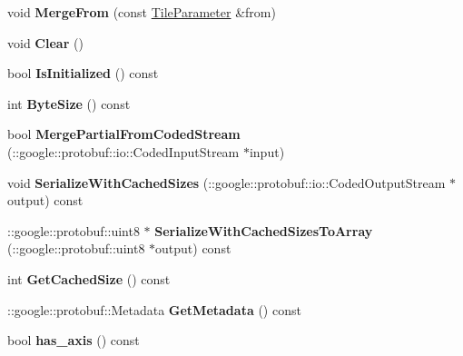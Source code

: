 \begin{DoxyCompactItemize}
void {\bfseries Merge\+From} (const \mbox{\hyperlink{classcaffe_1_1_tile_parameter}{Tile\+Parameter}} \&from)
\item 
\mbox{\label{classcaffe_1_1_tile_parameter_a7fba77cde4fec14435a2952eab535b62}} 
void {\bfseries Clear} ()
\item 
\mbox{\label{classcaffe_1_1_tile_parameter_a5b1913c75e58b26e7419bb8704f5d64e}} 
bool {\bfseries Is\+Initialized} () const
\item 
\mbox{\label{classcaffe_1_1_tile_parameter_ab3da1188e9cdfc7d8caee71db590a9c8}} 
int {\bfseries Byte\+Size} () const
\item 
\mbox{\label{classcaffe_1_1_tile_parameter_a9c9c8315e1be7193912828ce9f94c58e}} 
bool {\bfseries Merge\+Partial\+From\+Coded\+Stream} (\+::google\+::protobuf\+::io\+::\+Coded\+Input\+Stream $\ast$input)
\item 
\mbox{\label{classcaffe_1_1_tile_parameter_a80834c6845bc094534df01d173f0834c}} 
void {\bfseries Serialize\+With\+Cached\+Sizes} (\+::google\+::protobuf\+::io\+::\+Coded\+Output\+Stream $\ast$output) const
\item 
\mbox{\label{classcaffe_1_1_tile_parameter_ad829bd891e4b68d05787a52db4cda269}} 
\+::google\+::protobuf\+::uint8 $\ast$ {\bfseries Serialize\+With\+Cached\+Sizes\+To\+Array} (\+::google\+::protobuf\+::uint8 $\ast$output) const
\item 
\mbox{\label{classcaffe_1_1_tile_parameter_a6036e6ff22db5759f32b4b5d6366e2a4}} 
int {\bfseries Get\+Cached\+Size} () const
\item 
\mbox{\label{classcaffe_1_1_tile_parameter_a7fdf1765075b00e72b67e8354ecef5f1}} 
\+::google\+::protobuf\+::\+Metadata {\bfseries Get\+Metadata} () const
\item 
\mbox{\label{classcaffe_1_1_tile_parameter_a1d726599f15651c709a550c93ad8d3a9}} 
bool {\bfseries has\+\_\+axis} () const
\item 

\end{DoxyCompactItemize}
